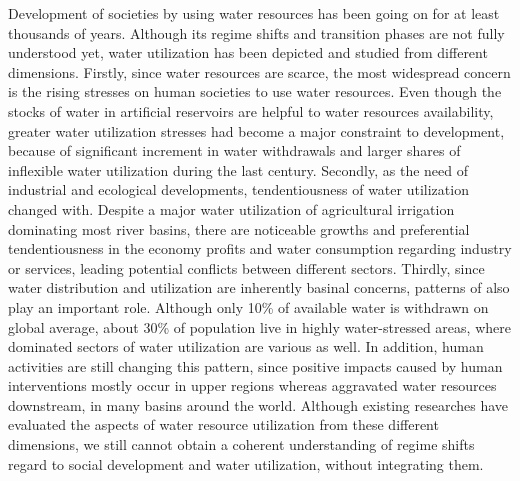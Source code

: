 \documentclass[9pt, twocolumn, twoside, lineno]{pnas-new}
\begin{document}
Development of societies by using water resources has been going on for at least thousands of years. Although its regime shifts and transition phases are not fully understood yet, water utilization has been depicted and studied from different dimensions.
Firstly, since water resources are scarce, the most widespread concern is the rising stresses on human societies to use water resources.
Even though the stocks of water in artificial reservoirs are helpful to water resources availability, greater water utilization stresses had become a major constraint to development, because of significant increment in water withdrawals and larger shares of inflexible water utilization during the last century.
\cite{postelHumanAppropriationRenewable1996, greveGlobalAssessmentWater2018a, qinFlexibilityIntensityGlobal2019}
Secondly, as the need of industrial and ecological developments, tendentiousness of water utilization changed with. 
Despite a major water utilization of agricultural irrigation dominating most river basins, there are noticeable growths and preferential tendentiousness in the economy profits and water consumption regarding industry or services, leading potential conflicts between different sectors.
\cite{liuWaterScarcityAssessments2017, florkeWaterCompetitionCities2018}
Thirdly, since water distribution and utilization are inherently basinal concerns, patterns of also play an important role.
Although only 10\% of available water is withdrawn on global average, about 30\% of population live in highly water-stressed areas,
where dominated sectors of water utilization are various as well. 
\cite{wadaWedgeApproachWater2014, okiGlobalHydrologicalCycles2006}
In addition, human activities are still changing this pattern, since positive impacts caused by human interventions mostly occur in upper regions whereas aggravated water resources downstream, in many basins around the world.
\cite{veldkampWaterScarcityHotspots2017}
Although existing researches have evaluated the aspects of water resource utilization from these different dimensions, we still cannot obtain a coherent understanding of regime shifts regard to social development and water utilization, without integrating them.
\end{document}
